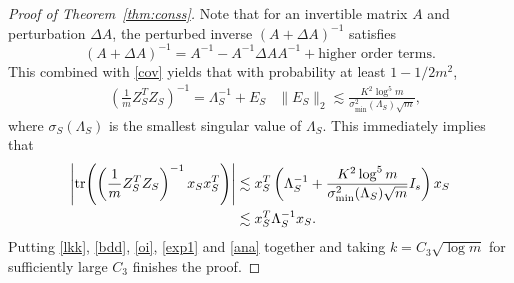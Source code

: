 \documentclass[a4paper,11pt]{article}
\numberwithin{equation}{section}
\theoremstyle{plain}
\theoremstyle{definition}
\begin{document}
\begin{proof}[Proof of Theorem~\ref{thm:conss}]
Note that for an invertible matrix $A$ and perturbation $\Delta A$, the perturbed inverse $(A+\Delta A)^{-1}$ satisfies
$$(A+\Delta A)^{-1} =  A^{-1}-A^{-1}\Delta AA^{-1} + \text{higher order terms}.$$ 
This combined with \eqref{cov} yields that with probability at least $1-1/2m^{2}$,
\begin{align}
&\left(\frac{1}{m}Z_S^TZ_S\right)^{-1} = \Lambda_S^{-1} + E_S& \|E_S\|_2\lesssim \frac{K^2\log^5 m}{\sigma^2_{\min}(\Lambda_S)\sqrt{m}},
\end{align}
where $\sigma_S(\Lambda_S)$ is the smallest singular value of $\Lambda_S$. 
This immediately implies that
\begin{align}
\left|\tr(\left(\frac{1}{m}Z_S^TZ_S\right)^{-1} x_Sx_S^T)\right|&\lesssim x_S^T\left(\Lambda_S^{-1}+\frac{K^2\log^5 m}{\sigma^2_{\min}(\Lambda_S)\sqrt{m}} I_s\right)x_S\nonumber\\
&\lesssim x_S^T\Lambda_S^{-1}x_S. \label{lkk}
\end{align}
Putting \eqref{lkk}, \eqref{bdd}, \eqref{oi}, \eqref{exp1} and \eqref{ana} together and taking $k=C_3\sqrt{\log m}$ for sufficiently large $C_3$ finishes the proof. 
\end{proof}
\end{document}
